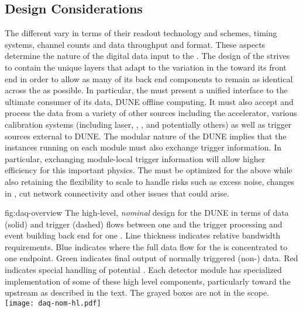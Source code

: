 \subsection{Design Considerations}
\label{sec:fd-daq-des-consid}

The different  vary in terms of their
readout technology and schemes, timing systems, channel counts and data
throughput and format.
These aspects determine the nature of the digital data input
to the . 
The design of the  strives to contain the unique layers that adapt
to the variation in the  toward its front end in
order to allow as many of its back end components to remain as identical across
the  as possible. 
In particular, the  must present a unified interface to the
ultimate consumer of its data, DUNE offline computing.
It must also accept and process the data from a variety of other
sources including the accelerator, various calibration systems
(including laser, , , and potentially
others) as well as trigger sources external to DUNE.
The modular nature of the DUNE  implies that the  instances running
on each module must also exchange trigger information. 
In particular, exchanging module-local  trigger information
will allow higher efficiency for this important physics.
The  must be optimized for the above while also retaining
the flexibility to scale to handle risks such as excess noise,
changes in , cut network connectivity and other issues that could arise. %

\begin{dunefigure}{fig:daq-overview}
  {The high-level, \textit{nominal} design for the DUNE   in
    terms of data (solid) and trigger (dashed) flows between one
      and the trigger processing and event
    building back end for one . 
    Line thickness indicates relative bandwidth requirements.
    Blue indicates where the full data flow for the  is
    concentrated to one endpoint.
    Green indicates final output of normally triggered (non-) data.
    Red indicates special handling of potential . 
    Each detector module has specialized implementation of some of these
    high level components, particularly toward the upstream 
    as described in the text. 
    The grayed boxes are not in the  scope.
  }
  \texttt{[image: daq-nom-hl.pdf]}%
\end{dunefigure}

